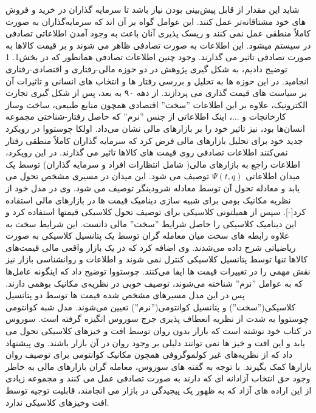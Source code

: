 \documentclass[a4paper,titlepage,12pt,fleqn,oneside]{report}
\begin{document}
  شاید این مقدار از قابل پیش‌بینی بودن نیاز باشد تا سرمایه گذاران در خرید و فروش های خود مشتاقانه‌تر عمل کنند.  این عوامل گواه بر آن اند که سرمایه‌گذاران به صورت کاملاً منطقی عمل نمی کنند و ریسک پذیری آنان باعث به وجود آمدن اطلاعاتی تصادفی در سیستم میشود.  این اطلاعات به صورت تصادفی ظاهر می شوند و بر قیمت کالاها به صورت تصادفی تاثیر می گذارند.  وجود چنین اطلاعات تصادفی  همانطور که در بخش1. 1 توضیح دادیم، به شکل گیری پژوهش در دو حوزه مالی-رفتاری و اقتصادی-رفتاری انجامید. در این حوزه ها به تحلیل و بررسی رفتار ها و انتخاب های انسانی و تاثیرات آن بر سیاست های قیمت گذاری می پردازند. از دهه ۹۰ به بعد، پس از شکل گیری تجارت الکترونیک، علاوه بر این اطلاعات ''سخت'' اقتصادی همچون منابع  طبیعی، ساخت وساز کارخانجات و ...، اینک اطلاعاتی از جنس ''نرم'' که حاصل رفتار-شناختی مجموعه انسان‌ها بود،  نیز تاثیر خود را بر بازارهای مالی نشان می‌داد.  اولکا چوستووا در رویکرد جدید خود برای تحلیل بازارهای مالی فرض کرد که سرمایه گذاران کاملاً منطقی رفتار نمی‌کنند اطلاعات تصادفی روی قیمت های کالاها تاثیر می گذارند.  در این رویکرد،  اطلاعات راجع به بازارهای مالی( شامل انتظارات افراد و سرمایه گذاران)  توسط یک میدان اطلاعاتی $\Psi(t,q)$  توصیف می شود.  این میدان در مسیری مشخص تحول می یابد و معادله تحول آن توسط معادله شرودینگر توصیف می شود.  وی در مدل خود از نظریه مکانیک بومی برای  شبیه سازی دینامیک قیمت ها در بازارهای مالی استفاده کرد[-].  سپس از همیلتونی کلاسیکی برای توصیف تحول کلاسیکی قیمتها استفاده کرد و  این دینامیک کلاسیکی را حاصل شرایط ''سخت'' مالی دانست.  این شرایط سخت به علاوه رابطه های سخت میان معامله گران توسط یک پتانسیل کلاسیکی به صورت ریاضیاتی شرح داده می‌شدند.  وی اضافه کرد که در یک بازار واقعی مالی قیمت‌های کالاها تنها توسط پتانسیل کلاسیکی کنترل نمی شوند و اطلاعات و روانشناسی بازار نیز نقش مهمی را در تغییرات قیمت ها ایفا می‌کنند. چوستووا  توضیح داد که اینگونه عامل‌ها که به عوامل ''نرم'' شناخته می‌شوند، توصیف خوبی در نظریه‌ی مکانیک بوهمی ‌دارند.  پس در این مدل مسیرهای مشخص شده قیمت ها توسط دو پتانسیل کلاسیکی(''سخت'')  و پتانسیل کوانتومی(''نرم'') تعیین می‌شوند.  مدل شبه کوانتومی چوستووا به شدت از نظریه انعطاف پذیری جرج سوروس انگیزه گرفته است. سوروس در کتاب خود نوشته است که بازار بدون روان توسط افت و خیزهای کلاسیکی تحول می یابد و این افت و خیز ها نمی توانند دلیلی بر وجود روان در آن بازار باشند. وی  پیشنهاد داد که از نظریه‌های غیر کولموگروفی همچون مکانیک کوانتومی برای توصیف روان بازارها کمک بگیرند.   با توجه به گفته های سوروس،  معامله گران بازارهای مالی به خاطر وجود حق انتخاب آزادانه ای که دارند به صورت تصادفی عمل می کنند  و مجموعه زیادی از این اراده های آزاد که به ظهور یک پیچیدگی در بازار می انجامند، قابلیت توجیه توسط افت وخیزهای کلاسیکی ندارد.  
  
\end{document}
